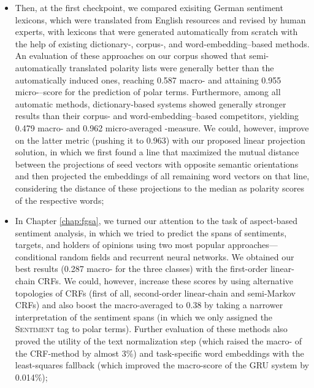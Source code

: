 \begin{itemize}
\item Then, at the first checkpoint, we compared exisiting German
  sentiment lexicons, which were translated from English resources and
  revised by human experts, with lexicons that were generated
  automatically from scratch with the help of existing
  dictionary\mbox{-,} corpus\mbox{-,} and word-embedding--based
  methods.  An evaluation of these approaches on our corpus showed
  that semi-automatically translated polarity lists were generally
  better than the automatically induced ones, reaching 0.587
  macro-\F{} and attaining 0.955 micro-\F{}--score for the prediction
  of polar terms.  Furthermore, among all automatic methods,
  dictionary-based systems showed generally stronger results than
  their corpus- and word-embedding--based competitors, yielding 0.479
  macro-\F{} and 0.962 micro-averaged \F{}-measure.  We could,
  however, improve on the latter metric (pushing it to 0.963) with our
  proposed linear projection solution, in which we first found a line
  that maximized the mutual distance between the projections of seed
  vectors with opposite semantic orientations and then projected the
  embeddings of all remaining word vectors on that line, considering
  the distance of these projections to the median as polarity scores
  of the respective words;

\item In Chapter \ref{chap:fgsa}, we turned our attention to the task
  of aspect-based sentiment analysis, in which we tried to predict the
  spans of sentiments, targets, and holders of opinions using two most
  popular approaches---conditional random fields and recurrent neural
  networks.  We obtained our best results (0.287 macro-\F{} for the
  three classes) with the first-order linear-chain CRFs.  We could,
  however, increase these scores by using alternative topologies of
  CRFs (first of all, second-order linear-chain and semi-Markov CRFs)
  and also boost the macro-averaged \F{} to 0.38 by taking a narrower
  interpretation of the sentiment spans (in which we only assigned the
  \textsc{Sentiment} tag to polar terms).  Further evaluation of these
  methods also proved the utility of the text normalization step
  (which raised the macro-\F{} of the CRF-method by almost 3\%) and
  task-specific word embeddings with the least-squares fallback (which
  improved the macro-score of the GRU system by 0.014\%);


\end{itemize}
